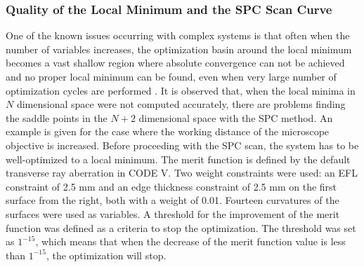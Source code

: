 \subsubsection{Quality of the Local Minimum and the SPC Scan Curve}
One of the known issues occurring with complex systems is that often when the number of variables increases, the optimization basin around the local minimum becomes a vast shallow region where absolute convergence can not be achieved and no proper local minimum can be found, even when very large number of optimization cycles are performed \cite{Brixner81}. It is observed that, when the local minima in $N$ dimensional space were not computed accurately, there are problems finding the saddle points in the $N+2$ dimensional space with the SPC method. An example is given for the case where the working distance of the microscope objective is increased. Before proceeding with the SPC scan, the system has to be well-optimized to a local minimum. The merit function is defined by the default transverse ray aberration in CODE V. Two weight constraints were used: an EFL constraint of 2.5 mm and an edge thickness constraint of 2.5 mm on the first surface from the right, both with a weight of 0.01. Fourteen curvatures of the surfaces were used as variables. A threshold for the improvement of the merit function was defined as a criteria to stop the optimization. The threshold was set as $1^{-15}$, which means that when the decrease of the merit function value is less than $1^{-15}$, the optimization will stop. 
 
